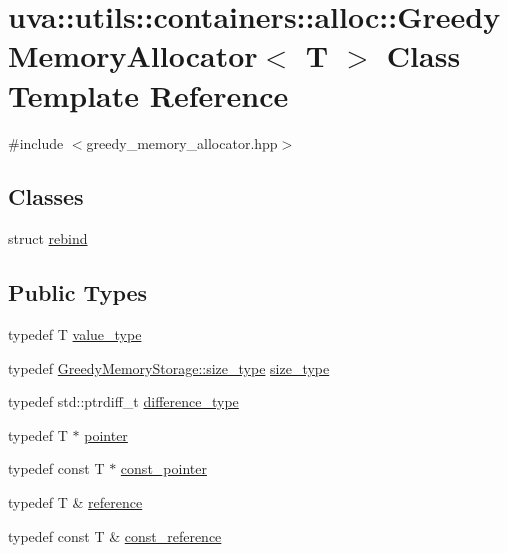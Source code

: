 \hypertarget{classuva_1_1utils_1_1containers_1_1alloc_1_1_greedy_memory_allocator}{}\section{uva\+:\+:utils\+:\+:containers\+:\+:alloc\+:\+:Greedy\+Memory\+Allocator$<$ T $>$ Class Template Reference}
\label{classuva_1_1utils_1_1containers_1_1alloc_1_1_greedy_memory_allocator}


{\ttfamily \#include $<$greedy\+\_\+memory\+\_\+allocator.\+hpp$>$}

\subsection*{Classes}
\begin{DoxyCompactItemize}
\item 
struct \hyperlink{structuva_1_1utils_1_1containers_1_1alloc_1_1_greedy_memory_allocator_1_1rebind}{rebind}
\end{DoxyCompactItemize}
\subsection*{Public Types}
\begin{DoxyCompactItemize}
\item 
typedef T \hyperlink{classuva_1_1utils_1_1containers_1_1alloc_1_1_greedy_memory_allocator_a8542d3bc26951148b64d3a978e5d213c}{value\+\_\+type}
\item 
typedef \hyperlink{classuva_1_1utils_1_1containers_1_1_greedy_memory_storage_a750d36c7e6c18135ccc45bf105f860e5}{Greedy\+Memory\+Storage\+::size\+\_\+type} \hyperlink{classuva_1_1utils_1_1containers_1_1alloc_1_1_greedy_memory_allocator_a645a2906fb2579230ee5f98e98161c11}{size\+\_\+type}
\item 
typedef std\+::ptrdiff\+\_\+t \hyperlink{classuva_1_1utils_1_1containers_1_1alloc_1_1_greedy_memory_allocator_a98bc6b16e7d75b7a2e13ddfba36c846d}{difference\+\_\+type}
\item 
typedef T $\ast$ \hyperlink{classuva_1_1utils_1_1containers_1_1alloc_1_1_greedy_memory_allocator_a91591d8ee983d330817127d4acaeea27}{pointer}
\item 
typedef const T $\ast$ \hyperlink{classuva_1_1utils_1_1containers_1_1alloc_1_1_greedy_memory_allocator_a206c9d79b70e9935b7de841ceb45ab7f}{const\+\_\+pointer}
\item 
typedef T \& \hyperlink{classuva_1_1utils_1_1containers_1_1alloc_1_1_greedy_memory_allocator_ac2a2c7238fc7d9727230c23bd3cc8743}{reference}
\item 
typedef const T \& \hyperlink{classuva_1_1utils_1_1containers_1_1alloc_1_1_greedy_memory_allocator_a7911b8e1f044aab418c3b46d6df2f92a}{const\+\_\+reference}
\end{DoxyCompactItemize}
